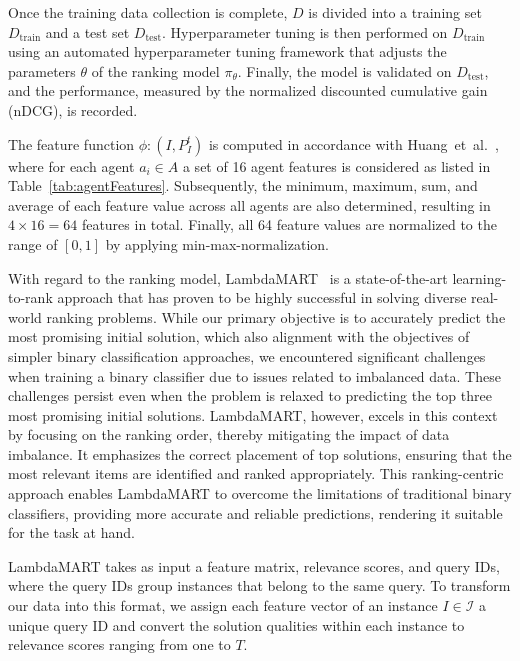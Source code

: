 \documentclass[runningheads]{llncs}
\begin{document}
Once the training data collection is complete, $D$ is divided into a training set $D_\mathrm{train}$ and a test set $D_\mathrm{test}$. Hyperparameter tuning is then performed on $D_\mathrm{train}$ using an automated hyperparameter tuning framework that adjusts the parameters $\theta$ of the ranking model $\pi_\theta$. Finally, the model is validated on $D_\mathrm{test}$, and the performance, measured by the normalized discounted cumulative gain (nDCG), is recorded.

The feature function $\phi:(I,P_I^t)$ is computed in accordance with Huang~et~al.~\cite{huang-2022}, where for each agent $a_i\in A$ a set of 16 agent features is considered as listed in Table~\ref{tab:agentFeatures}. Subsequently, the minimum, maximum, sum, and average of each feature value across all agents are also determined, resulting in $4 \times 16 = 64$ features in total. Finally, all 64 feature values are normalized to the range of $[0,1]$ by applying min-max-normalization. 

With regard to the ranking model, LambdaMART~\cite{burges-2010} is a state-of-the-art learning-to-rank approach that has proven to be highly successful in solving diverse real-world ranking problems. While our primary objective is to accurately predict the most promising initial solution, which also alignment with the objectives of simpler binary classification approaches, we encountered significant challenges when training a binary classifier due to issues related to imbalanced data. These challenges persist even when the problem is relaxed to predicting the top three most promising initial solutions. LambdaMART, however, excels in this context by focusing on the ranking order, thereby mitigating the impact of data imbalance. It emphasizes the correct placement of top solutions, ensuring that the most relevant items are identified and ranked appropriately. This ranking-centric approach enables LambdaMART to overcome the limitations of traditional binary classifiers, providing more accurate and reliable predictions, rendering it suitable for the task at hand. 

LambdaMART takes as input a feature matrix, relevance scores, and query IDs, where the query IDs group instances that belong to the same query. To transform our data into this format, we assign each feature vector of an instance $I \in \mathcal{I}$ a unique query ID and convert the solution qualities within each instance to relevance scores ranging from one to $T$.
\end{document}
